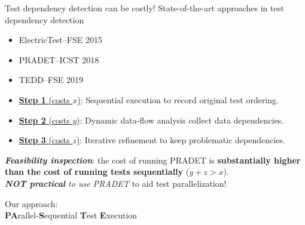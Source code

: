 \documentclass{beamer}
\begin{document}
\begin{frame}{Test dependency detection can be costly!}
State-of-the-art approaches in test dependency detection
\begin{itemize}\pause
	\item{ElectricTest--FSE 2015}
	\item{PRADET--ICST 2018}
	\item{TEDD--FSE 2019}
\end{itemize}
\begin{itemize}
	\fontsize{11}{11}\selectfont
	\item[]{\underline{\textbf{Step 1} (costs $x$)}: {\rsm Sequential execution} to record original test ordering.}\pause
	\item[]{\underline{\textbf{Step 2} (costs $y$)}: {\rsm Dynamic data-flow analysis} collect data dependencies.}\pause
	\item[]{\underline{\textbf{Step 3} (costs $z$)}: {\rsm Iterative refinement} to keep problematic dependencies.}\pause
\end{itemize}
\begin{center}
	\begin{tcolorbox}
		\textit{\textbf{Feasibility inspection}}: the cost of running {\rsm PRADET} is {\color{red} \textbf{substantially higher than the cost of running tests sequentially}} ($y+z>{x}$).\\\textit{\textbf{NOT practical} to use PRADET} to aid test parallelization!
	\end{tcolorbox}
\end{center}
\end{frame}

\begingroup
\renewcommand{\disp}{}
\begin{frame}
	\begin{center}
		Our approach: \textbf{\tname}\\
		{\textbf{\rsm PA}rallel-\textbf{\rsm S}equential \textbf{\rsm T}est \textbf{\rsm E}xecution}
	\end{center}
\end{frame}
\endgroup
\addtocounter{framenumber}{-1}
\end{document}
